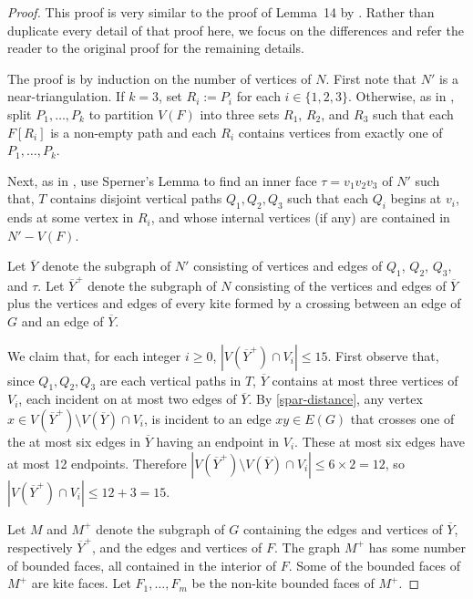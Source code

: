 \documentclass{patmorin}
\renewcommand{\ge}{\geqslant}
\renewcommand{\le}{\leqslant}
\begin{document}
\begin{proof}
  This proof is very similar to the proof of Lemma~14 by \citet{dujmovic.joret.ea:planar}. Rather than duplicate every detail of that proof here, we focus on the differences and refer the reader to the original proof for the remaining details.
  
  The proof is by induction on the number of vertices of $N$.
  First note that $N'$ is a near-triangulation.  If $k=3$, set $R_i := P_i$ for each $i\in\{1,2,3\}$.  Otherwise, as in \citep{dujmovic.joret.ea:planar}, split $P_1,\ldots,P_k$ to partition $V(F)$ into three sets $R_1$, $R_2$, and $R_3$ such that each $F[R_i]$ is a non-empty path and each $R_i$ contains vertices from exactly one of $P_1,\ldots,P_k$. 
  
  Next, as in \citep{dujmovic.joret.ea:planar}, use Sperner's Lemma to find an inner face $\tau=v_1v_2v_3$ of $N'$ such that, $T$ contains disjoint vertical paths $Q_1,Q_2,Q_3$ such that each $Q_i$ begins at $v_i$, ends at some vertex in $R_i$, and whose internal vertices (if any) are contained in $N'-V(F)$.
  
  Let $\overline{Y}$ denote the subgraph of $N'$ consisting of vertices and edges of $Q_1$, $Q_2$, $Q_3$, and $\tau$.  Let $\overline{Y}^+$ denote the subgraph of $N$ consisting of the vertices and edges of $\overline{Y}$ plus the vertices and edges of every kite formed by a crossing between an edge of $G$ and an edge of $\overline{Y}$.
  
  We claim that, for each integer $i\ge 0$, $|V(\overline{Y}^+)\cap V_i|\le 15$.  First observe that, since $Q_1,Q_2,Q_3$ are each vertical paths in $T$,  $\overline{Y}$ contains at most three vertices of $V_i$, each incident on at most two edges of $\overline{Y}$.  By \eqref{spar-distance}, any vertex $x\in V(\overline{Y}^+)\setminus V(\overline{Y})\cap V_i$, is incident to an edge $xy\in E(G)$ that crosses one of the at most six edges in $\overline{Y}$ having an endpoint in $V_i$.  These at most six edges have at most 12 endpoints.  Therefore $|V(\overline{Y}^+)\setminus V(\overline{Y})\cap V_i|\le 6\times 2=12$, so $|V(\overline{Y}^+)\cap V_i|\le 12+3=15$.
  
  Let $M$ and $M^+$ denote the subgraph of $G$ containing the edges and vertices of $\overline{Y}$, respectively $\overline{Y}^+$, and the edges and vertices of $F$.  The graph $M^+$ has some number of bounded faces, all contained in the interior of $F$. Some of the bounded faces of $M^+$ are kite faces. Let $F_1,\ldots,F_m$ be the non-kite bounded faces of $M^+$.  
  

\end{proof}
\end{document}
